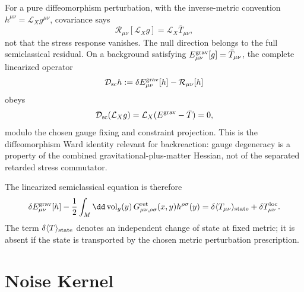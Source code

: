 For a pure diffeomorphism perturbation, with the inverse-metric convention
\(h^{\mu\nu}=\mathcal L_Xg^{\mu\nu}\), covariance says
\begin{equation}
  \mathcal R_{\mu\nu}[\mathcal L_X g]
  =
  \mathcal L_X\bar T_{\mu\nu},
  \label{eq:semiclassical-pure-gauge-stress-response}
\end{equation}
not that the stress response vanishes.  The null direction belongs to the full
semiclassical residual.  On a background satisfying
\(E_{\mu\nu}^{\rm grav}[g]=\bar T_{\mu\nu}\), the complete linearized operator
\[
  \mathcal D_{\rm sc}h
  :=
  \delta E_{\mu\nu}^{\rm grav}[h]-\mathcal R_{\mu\nu}[h]
\]
obeys
\begin{equation}
  \mathcal D_{\rm sc}(\mathcal L_X g)
  =
  \mathcal L_X(E^{\rm grav}-\bar T)
  =
  0,
  \label{eq:semiclassical-full-hessian-gauge-identity}
\end{equation}
modulo the chosen gauge fixing and constraint projection.  This is the
diffeomorphism Ward identity relevant for backreaction: gauge degeneracy is a
property of the combined gravitational-plus-matter Hessian, not of the
separated retarded stress commutator.

The linearized semiclassical equation is therefore
\begin{equation}
  \delta E_{\mu\nu}^{\rm grav}[h]
  -
  \frac12\int_M\dd\operatorname{vol}_g(y)\,
  G^{\rm ret}_{\mu\nu,\rho\sigma}(x,y)h^{\rho\sigma}(y)
  =
  \delta\langle T_{\mu\nu}\rangle_{\rm state}
  +
  \delta T_{\mu\nu}^{\rm loc}.
  \label{eq:semiclassical-linearized-equation}
\end{equation}
The term \(\delta\langle T\rangle_{\rm state}\) denotes an independent
change of state at fixed metric; it is absent if the state is transported by
the chosen metric perturbation prescription.

\section{Noise Kernel}

